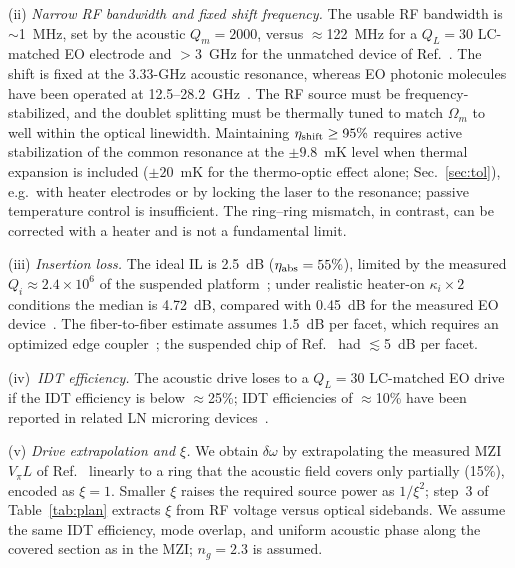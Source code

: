 \documentclass[aps,prapplied,reprint,superscriptaddress,amsmath,amssymb,floatfix]{revtex4-2}
\newcommand{\etash}{\eta_{\rm shift}}
\newcommand{\etaabs}{\eta_{\rm abs}}
\begin{document}
(ii) \emph{Narrow RF bandwidth and fixed shift frequency.} The usable RF bandwidth is $\sim$1~MHz, set by the acoustic $Q_m=2000$, versus $\approx$122~MHz for a $Q_L=30$ LC-matched EO electrode and $>$3~GHz for the unmatched device of Ref.~\cite{Hu2021}. The shift is fixed at the 3.33-GHz acoustic resonance, whereas EO photonic molecules have been operated at 12.5--28.2~GHz~\cite{Hu2021}. The RF source must be frequency-stabilized, and the doublet splitting must be thermally tuned to match $\Omega_m$ to well within the optical linewidth. Maintaining $\etash\ge95\%$ requires active stabilization of the common resonance at the $\pm9.8$~mK level when thermal expansion is included ($\pm20$~mK for the thermo-optic effect alone; Sec.~\ref{sec:tol}), e.g.\ with heater electrodes or by locking the laser to the resonance; passive temperature control is insufficient. The ring--ring mismatch, in contrast, can be corrected with a heater and is not a fundamental limit.

(iii) \emph{Insertion loss.} The ideal IL is 2.5~dB ($\etaabs=55\%$), limited by the measured $Q_i\approx2.4\times10^6$ of the suspended platform~\cite{Shao2019}; under realistic heater-on $\kappa_i\times2$ conditions the median is 4.72~dB, compared with 0.45~dB for the measured EO device~\cite{Hu2021}. The fiber-to-fiber estimate assumes 1.5~dB per facet, which requires an optimized edge coupler~\cite{Jia2023}; the suspended chip of Ref.~\cite{Shao2019} had $\lesssim$5~dB per facet.

(iv)~\emph{IDT efficiency.} The acoustic drive loses to a $Q_L=30$ LC-matched EO drive if the IDT efficiency is below $\approx$25\%; IDT efficiencies of $\approx$10\% have been reported in related LN microring devices~\cite{Xu2025b}.

(v) \emph{Drive extrapolation and $\xi$.} We obtain $\delta\omega$ by extrapolating the measured MZI $V_\pi L$ of Ref.~\cite{Shao2019} linearly to a ring that the acoustic field covers only partially (15\%), encoded as $\xi=1$. Smaller $\xi$ raises the required source power as $1/\xi^2$; step~3 of Table~\ref{tab:plan} extracts $\xi$ from RF voltage versus optical sidebands. We assume the same IDT efficiency, mode overlap, and uniform acoustic phase along the covered section as in the MZI; $n_g=2.3$ is assumed.
\end{document}
